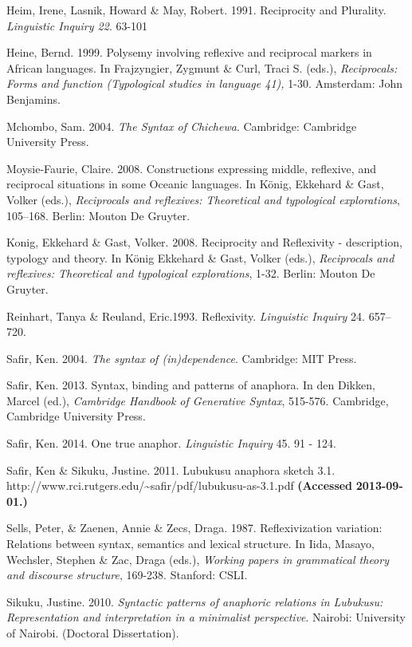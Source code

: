 \documentclass[output=paper]{langsci/langscibook}
\begin{document}
Heim, Irene, Lasnik, Howard \& May, Robert. 1991. Reciprocity and Plurality. \textit{Linguistic Inquiry 22}. 63-101

Heine, Bernd. 1999. Polysemy involving reflexive and reciprocal markers in African languages. In Frajzyngier, Zygmunt \& Curl, Traci S. (eds.), \textit{Reciprocals: Forms and function (Typological studies in language 41), }1-30. Amsterdam: John Benjamins.

Mchombo, Sam. 2004. \textit{The Syntax of Chichewa}. Cambridge: Cambridge University Press. 

Moysie-Faurie, Claire. 2008. Constructions expressing middle, reflexive, and reciprocal situations in some Oceanic languages. In König, Ekkehard \& Gast, Volker (eds.), \textit{Reciprocals and reflexives: Theoretical and typological explorations}, 105–168. Berlin: Mouton De Gruyter.

Konig, Ekkehard \& Gast, Volker. 2008. Reciprocity and Reflexivity - description, typology and theory. In König Ekkehard \& Gast, Volker (eds.), \textit{Reciprocals and reflexives: Theoretical and typological explorations}, 1-32. Berlin: Mouton De Gruyter.

Reinhart, Tanya \& Reuland, Eric.1993. Reﬂexivity. \textit{Linguistic Inquiry} 24. 657–720.

Safir, Ken. 2004. \textit{The syntax of (in)dependence}. Cambridge: MIT Press.

Safir, Ken. 2013. Syntax, binding and patterns of anaphora. In den Dikken, Marcel (ed.), \textit{Cambridge Handbook of Generative Syntax}, 515-576. Cambridge, Cambridge\textit{ }University Press.

Safir, Ken. 2014. One true anaphor. \textit{Linguistic Inquiry} 45. 91 - 124.

Safir, Ken \& Sikuku, Justine. 2011. Lubukusu anaphora sketch 3.1. http://www.rci.rutgers.edu/{\textasciitilde}safir/pdf/lubukusu-as-3.1.pdf \textbf{\textmd{(Accessed}}\textbf{ 2013-09-01.)}

Sells, Peter, \& Zaenen, Annie \& Zecs, Draga. 1987. Reflexivization variation: Relations between syntax, semantics and lexical structure. In Iida, Masayo, Wechsler, Stephen \& Zac, Draga (eds.), \textit{Working papers in grammatical theory and discourse structure}, 169-238. Stanford: CSLI. 

Sikuku, Justine. 2010. \textit{Syntactic patterns of anaphoric relations in Lubukusu: Representation and interpretation in a minimalist perspective}. Nairobi: University of Nairobi. (Doctoral Dissertation).
\end{document}
